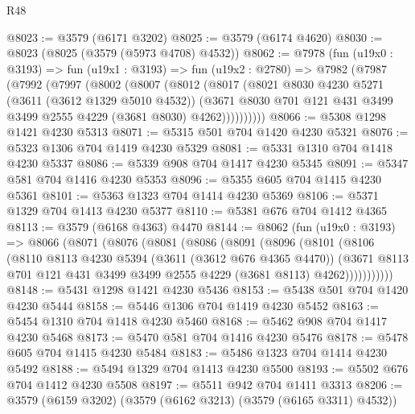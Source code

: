 \begin{lexlean}{R48}
\begin{coremodule}
@8023 := @3579 (@6171 @3202)
@8025 := @3579 (@6174 @4620)
@8030 := @8023 (@8025 (@3579 (@5973 @4708) @4532))
@8062 := @7978
    (fun (u19x0 : @3193) =>
    fun (u19x1 : @3193) =>
    fun (u19x2 : @2780) =>
    @7982
      (@7987
        (@7992
          (@7997
            (@8002
              (@8007
                (@8012
                  (@8017
                    (@8021
                      @8030
                      @4230
                      @5271
                      (@3611 (@3612 @1329 @5010 @4532))
                      (@3671
                        @8030
                        @701
                        @121
                        @431
                        @3499
                        @3499
                        @2555
                        @4229
                        (@3681 @8030)
                        @4262))))))))))
@8066 := @5308 @1298 @1421 @4230 @5313
@8071 := @5315 @501 @704 @1420 @4230 @5321
@8076 := @5323 @1306 @704 @1419 @4230 @5329
@8081 := @5331 @1310 @704 @1418 @4230 @5337
@8086 := @5339 @908 @704 @1417 @4230 @5345
@8091 := @5347 @581 @704 @1416 @4230 @5353
@8096 := @5355 @605 @704 @1415 @4230 @5361
@8101 := @5363 @1323 @704 @1414 @4230 @5369
@8106 := @5371 @1329 @704 @1413 @4230 @5377
@8110 := @5381 @676 @704 @1412 @4365
@8113 := @3579 (@6168 @4363) @4470
@8144 := @8062
    (fun (u19x0 : @3193) =>
    @8066
      (@8071
        (@8076
          (@8081
            (@8086
              (@8091
                (@8096
                  (@8101
                    (@8106
                      (@8110
                        @8113
                        @4230
                        @5394
                        (@3611 (@3612 @676 @4365 @4470))
                        (@3671
                          @8113
                          @701
                          @121
                          @431
                          @3499
                          @3499
                          @2555
                          @4229
                          (@3681 @8113)
                          @4262)))))))))))
@8148 := @5431 @1298 @1421 @4230 @5436
@8153 := @5438 @501 @704 @1420 @4230 @5444
@8158 := @5446 @1306 @704 @1419 @4230 @5452
@8163 := @5454 @1310 @704 @1418 @4230 @5460
@8168 := @5462 @908 @704 @1417 @4230 @5468
@8173 := @5470 @581 @704 @1416 @4230 @5476
@8178 := @5478 @605 @704 @1415 @4230 @5484
@8183 := @5486 @1323 @704 @1414 @4230 @5492
@8188 := @5494 @1329 @704 @1413 @4230 @5500
@8193 := @5502 @676 @704 @1412 @4230 @5508
@8197 := @5511 @942 @704 @1411 @3313
@8206 := @3579 (@6159 @3202) (@3579 (@6162 @3213) (@3579 (@6165 @3311) @4532))

\end{coremodule}
\end{lexlean}
